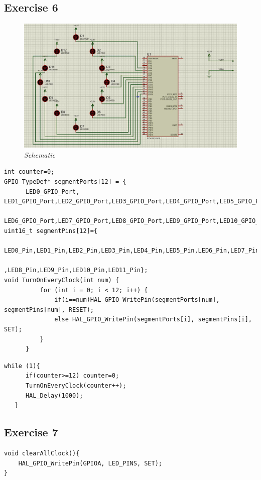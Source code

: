 \subsection{Exercise 6}


\begin{figure}[!htp]
    \centering
    \includegraphics[width=5in]{source/picture/bai_1/pic6.jpg}
    \caption{\textit{Schematic}}
    \label{bai1_pic3}
\end{figure}
\begin{lstlisting}[caption=Ex6.c]
int counter=0;
GPIO_TypeDef* segmentPorts[12] = {
      LED0_GPIO_Port, LED1_GPIO_Port,LED2_GPIO_Port,LED3_GPIO_Port,LED4_GPIO_Port,LED5_GPIO_Port,
	  LED6_GPIO_Port,LED7_GPIO_Port,LED8_GPIO_Port,LED9_GPIO_Port,LED10_GPIO_Port,LED11_GPIO_Port};
uint16_t segmentPins[12]={
    	LED0_Pin,LED1_Pin,LED2_Pin,LED3_Pin,LED4_Pin,LED5_Pin,LED6_Pin,LED7_Pin
    	                          ,LED8_Pin,LED9_Pin,LED10_Pin,LED11_Pin};
void TurnOnEveryClock(int num) {
          for (int i = 0; i < 12; i++) {
        	  if(i==num)HAL_GPIO_WritePin(segmentPorts[num], segmentPins[num], RESET);
        	  else HAL_GPIO_WritePin(segmentPorts[i], segmentPins[i], SET);
          }
      }
\end{lstlisting}
\begin{lstlisting}[caption=main.c]
while (1){
	  if(counter>=12) counter=0;
	  TurnOnEveryClock(counter++);
	  HAL_Delay(1000);
   }
\end{lstlisting}

\subsection{Exercise 7}

\begin{lstlisting}[caption=main.c]
void clearAllClock(){
    HAL_GPIO_WritePin(GPIOA, LED_PINS, SET);
}
\end{lstlisting}

